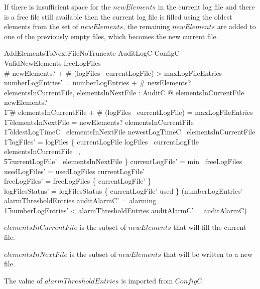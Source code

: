 If there is insufficient space for the $newElements$ in the
current log file and there is a free file still available then the
current log file is filled using the oldest elements from the set of
$newElements$, the remaining $newElements$ are added to one of the
previously empty files, which becomes the new current file.

\begin{schema}{AddElementsToNextFileNoTruncate}
      \Delta AuditLogC
\also
        ConfigC
\\      ValidNewElements
\where
        freeLogFiles \neq \emptyset
\\      \# newElements? + \# (logFiles~ currentLogFile) > maxLogFileEntries  
\also
        numberLogEntries' = numberLogEntries + \# newElements? 
\\      \exists elementsInCurrentFile, elementsInNextFile : \finset AuditC @
        elementsInCurrentFile \subseteq newElements? 
\\ \t1  \land 
        \# elementsInCurrentFile + \# (logFiles~ currentLogFile) =
        maxLogFileEntries
\\ \t1  \land elementsInNextFile = newElements? \setminus
        elementsInCurrentFile
\\ \t1  \land oldestLogTimeC~ elementsInNextFile \geq newestLogTimeC~
        elementsInCurrentFile 
\\ \t1  \land logFiles' = logFiles \oplus \{ currentLogFile \mapsto
            logFiles~ currentLogFile \cup elementsInCurrentFile~ ,
\\ \t5      currentLogFile'~ \mapsto elementsInNextFile \}
\also
        currentLogFile' = min~ freeLogFiles 
\\      usedLogFiles' = usedLogFiles \cat \langle currentLogFile' \rangle
\\      freeLogFiles' = freeLogFiles \setminus \{ currentLogFile' \}
\\      logFilesStatus' = logFilesStatus \oplus \{ currentLogFile'
\mapsto used \}
\also
      (numberLogEntries' \geq alarmThresholdEntries \land auditAlarmC' = alarming
\\ \t1   \lor numberLogEntries' < alarmThresholdEntries \land
auditAlarmC' = auditAlarmC)
\end{schema}
\begin{Zcomment}
\item
$elementsInCurrentFile$ is the subset of $newElements$ that will fill
the current file.
\item $elementsInNextFile$ is the subset of $newElements$ that will be
written to a new file.
\item
The value of $alarmThresholdEntries$ is imported from $ConfigC$. 
\end{Zcomment}

